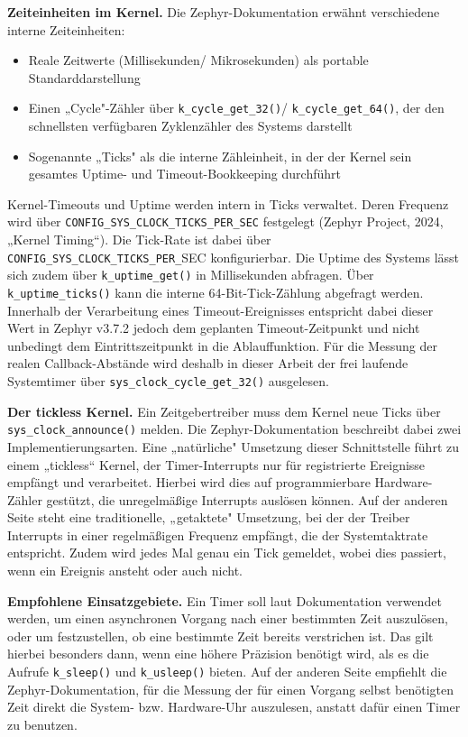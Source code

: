 \textbf{Zeiteinheiten im Kernel.} Die Zephyr-Dokumentation erwähnt verschiedene interne Zeiteinheiten:

\begin{itemize}
\item Reale Zeitwerte (Millisekunden/ Mikrosekunden) als portable Standarddarstellung
\item Einen „Cycle"-Zähler über \lstinline[style=fileinline]|k_cycle_get_32()|/ \lstinline[style=fileinline]|k_cycle_get_64()|, der den schnellsten verfügbaren Zyklenzähler des Systems darstellt
\item Sogenannte „Ticks" als die interne Zähleinheit, in der der Kernel sein gesamtes Uptime- und Timeout-Bookkeeping durchführt
\end{itemize}
Kernel-Timeouts und Uptime werden intern in Ticks verwaltet. Deren Frequenz wird über \lstinline[style=fileinline]|CONFIG_SYS_CLOCK_TICKS_PER_SEC| festgelegt (Zephyr Project, 2024, „Kernel Timing“). Die Tick-Rate ist dabei über \lstinline[style=fileinline]|CONFIG_SYS_CLOCK_TICKS_PER_|SEC konfigurierbar. Die Uptime des Systems lässt sich zudem über \lstinline[style=fileinline]|k_uptime_get()| in Millisekunden abfragen. Über \lstinline[style=fileinline]|k_uptime_ticks()| kann die interne 64-Bit-Tick-Zählung abgefragt werden. Innerhalb der Verarbeitung eines Timeout-Ereignisses entspricht dabei dieser Wert in Zephyr v3.7.2 jedoch dem geplanten Timeout-Zeitpunkt und nicht unbedingt dem Eintrittszeitpunkt in die Ablauffunktion. Für die Messung der realen Callback-Abstände wird deshalb in dieser Arbeit der frei laufende Systemtimer über \lstinline[style=fileinline]|sys_clock_cycle_get_32()| ausgelesen.

\textbf{Der tickless Kernel.} Ein Zeitgebertreiber muss dem Kernel neue Ticks über \lstinline[style=fileinline]|sys_clock_announce()| melden. Die Zephyr-Dokumentation beschreibt dabei zwei Implementierungsarten. Eine „natürliche" Umsetzung dieser Schnittstelle führt zu einem „tickless“ Kernel, der Timer-Interrupts nur für registrierte Ereignisse empfängt und verarbeitet. Hierbei wird dies auf programmierbare Hardware-Zähler gestützt, die unregelmäßige Interrupts auslösen können. Auf der anderen Seite steht eine traditionelle, „getaktete" Umsetzung, bei der der Treiber Interrupts in einer regelmäßigen Frequenz empfängt, die der Systemtaktrate entspricht. Zudem wird jedes Mal genau ein Tick gemeldet, wobei dies passiert, wenn ein Ereignis ansteht oder auch nicht.

\textbf{Empfohlene Einsatzgebiete.} Ein Timer soll laut Dokumentation verwendet werden, um einen asynchronen Vorgang nach einer bestimmten Zeit auszulösen, oder um festzustellen, ob eine bestimmte Zeit bereits verstrichen ist. Das gilt hierbei besonders dann, wenn eine höhere Präzision benötigt wird, als es die Aufrufe \lstinline[style=fileinline]|k_sleep()| und \lstinline[style=fileinline]|k_usleep()| bieten. Auf der anderen Seite empfiehlt die Zephyr-Dokumentation, für die Messung der für einen Vorgang selbst benötigten Zeit direkt die System- bzw. Hardware-Uhr auszulesen, anstatt dafür einen Timer zu benutzen.

